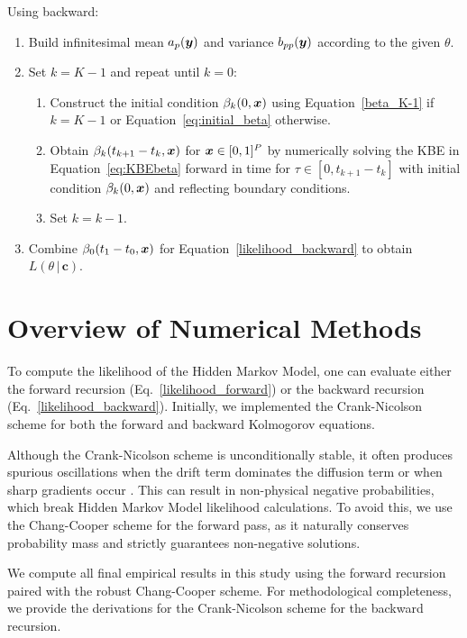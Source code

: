 \documentclass{article}
\def\x{\mbox{\boldmath $x$}}
\def\y{\mbox{\boldmath $y$}}
\begin{document}
Using backward:
\begin{enumerate}
    \item Build infinitesimal mean $a_p(\y)$ and variance $b_{pp}(\y)$ according to the given $\theta$.
    \item Set $k=K-1$ and repeat until $k=0$:
    \begin{enumerate}
        \item Construct the initial condition $\beta_{k}(0, \x)$ using Equation~\ref{beta_K-1} if $k=K-1$ or Equation~\ref{eq:initial_beta} otherwise.
        \item Obtain $\beta_{k}(t_{k+1}-t_k, \x)$ for $\x \in [0,1]^P$ by numerically solving the KBE in Equation~\ref{eq:KBEbeta} forward in time for $\tau \in [0, t_{k+1}-t_k]$ with initial condition $\beta_k(0, \x)$ and reflecting boundary conditions.
        \item Set $k=k-1$.
    \end{enumerate}
    \item Combine $\beta_0(t_1-t_0, \x)$ for Equation~\ref{likelihood_backward} to obtain $L(\theta \, | \, \mathbf{c})$.
\end{enumerate}

\FloatBarrier
\section{Overview of Numerical Methods}

To compute the likelihood of the Hidden Markov Model, one can evaluate either the forward recursion (Eq.~\ref{likelihood_forward}) or the backward recursion (Eq.~\ref{likelihood_backward}). Initially, we implemented the Crank-Nicolson scheme for both the forward and backward Kolmogorov equations. 

Although the Crank-Nicolson scheme is unconditionally stable, it often produces spurious oscillations when the drift term dominates the diffusion term or when sharp gradients occur \citep{morton2005}.
This can result in non-physical negative probabilities, which break Hidden Markov Model likelihood calculations.
To avoid this, we use the Chang-Cooper scheme \citep{chang1970, gutenkunst2009} for the forward pass, as it naturally conserves probability mass and strictly guarantees non-negative solutions.

We compute all final empirical results in this study using the forward recursion paired with the robust Chang-Cooper scheme.
For methodological completeness, we provide the derivations for the Crank-Nicolson scheme for the backward recursion.
\end{document}
